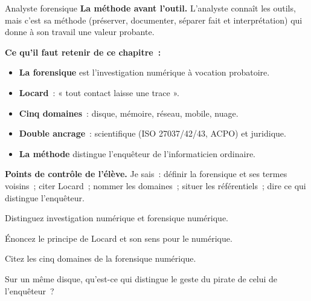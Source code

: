 \begin{boxmetier}{Analyste forensique}
\textbf{La méthode avant l'outil.} L'analyste connaît les outils, mais c'est
sa méthode (préserver, documenter, séparer fait et interprétation) qui donne
à son travail une valeur probante.
\end{boxmetier}

\separateur

\begin{boxresume}
\textbf{Ce qu'il faut retenir de ce chapitre~:}
\begin{itemize}
    \item \textbf{La forensique} est l'investigation numérique à vocation
          probatoire.
    \item \textbf{Locard}~: « tout contact laisse une trace ».
    \item \textbf{Cinq domaines}~: disque, mémoire, réseau, mobile, nuage.
    \item \textbf{Double ancrage}~: scientifique (ISO 27037/42/43, ACPO) et
          juridique.
    \item \textbf{La méthode} distingue l'enquêteur de l'informaticien
          ordinaire.
\end{itemize}
\end{boxresume}

\begin{boxinfo}
\textbf{Points de contrôle de l'élève.} Je sais~: définir la forensique et
ses termes voisins~; citer Locard~; nommer les domaines~; situer les
référentiels~; dire ce qui distingue l'enquêteur.
\end{boxinfo}

\bigskip

\begin{boxexo}[title={\ding{45}\quad Exercice~1.1. Termes \niveaubase}]
Distinguez investigation numérique et forensique numérique.
\end{boxexo}

\begin{boxexo}[title={\ding{45}\quad Exercice~1.2. Locard \niveaubase}]
Énoncez le principe de Locard et son sens pour le numérique.
\end{boxexo}

\begin{boxexo}[title={\ding{45}\quad Exercice~1.3. Domaines \niveaubase}]
Citez les cinq domaines de la forensique numérique.
\end{boxexo}

\begin{boxexo}[title={\ding{45}\quad Exercice~1.4. Pirate ou enquêteur \niveaumoyen}]
Sur un même disque, qu'est-ce qui distingue le geste du pirate de celui de
l'enquêteur~?
\end{boxexo}

